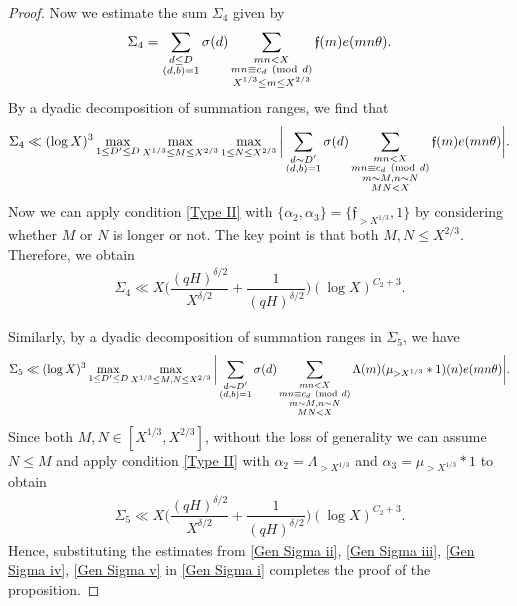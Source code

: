 \documentclass[12pt]{amsart}
\numberwithin{equation}{section}
\theoremstyle{remark}
\theoremstyle{definition}
\newcommand{\imod}[1]{\ (\mathrm{mod}\ #1)}
\begin{document}
\begin{proof}
Now we estimate the sum $\Sigma_4$ given by
\begin{align}\notag 
\Sigma_4 = \sum_{\substack{d\leq D\\(d, b)=1}}\sigma(d)\sum_{\substack{mn<X\\mn\equiv c_d\imod d\\ X^{1/3} \leq m\leq X^{2/3}}}\mathfrak{f}(m)e(mn\theta).
\end{align}
By a dyadic decomposition of summation ranges, we find that
\begin{align}\notag 
\Sigma_4\ll (\log X)^3 \max_{1\leq D'\leq D}\max_{X^{1/3}\leq M\leq X^{2/3}}\max_{1\leq N\leq X^{2/3}}\bigg|\sum_{\substack{d\sim D'\\(d, b)=1}}\sigma(d)\sum_{\substack{mn<X\\mn\equiv c_d\imod d\\ m\sim M, n\sim N\\MN<X}}\mathfrak{f}(m)e(mn\theta)\bigg|.
\end{align}
Now we can apply condition \ref{Type II} with $\{\alpha_2, \alpha_3\}=\{\mathfrak{f}_{>X^{1/3}}, 1\}$ by considering whether $M$ or $N$ is longer or not. The key point is that both $M, N\leq X^{2/3}$. Therefore, we obtain
\begin{align}
\label{Gen Sigma iv}\Sigma_4 \ll X\bigg(\dfrac{(qH)^{\delta/2}}{X^{\delta/2}} + \dfrac{1}{(qH)^{\delta/2}}\bigg)(\log X)^{C_2+3}.
\end{align}

Similarly, by a dyadic decomposition of summation ranges in $\Sigma_5$, we have
\begin{align}\notag
\Sigma_5 \ll (\log X)^3 \max_{1\leq D'\leq D}\max_{X^{1/3}\leq M, N\leq X^{2/3}}\bigg|\sum_{\substack{d\sim D'\\(d, b)=1}}\sigma(d)\sum_{\substack{mn<X\\mn\equiv c_d\imod d\\ m\sim M, n\sim N\\MN<X}}\Lambda(m) (\mu_{> X^{1/3}}*1)(n)e(mn\theta)\bigg|.
\end{align}
Since both $M, N\in [X^{1/3}, X^{2/3}]$, without the loss of generality we can assume $N\leq M$ and apply condition \ref{Type II} with $\alpha_2=\Lambda_{>X^{1/3}}$ and $\alpha_3= \mu_{>X^{1/3}}*1$ to obtain
\begin{align}
\label{Gen Sigma v}\Sigma_5 \ll X\bigg(\dfrac{(qH)^{\delta/2}}{X^{\delta/2}} + \dfrac{1}{(qH)^{\delta/2}}\bigg)(\log X)^{C_2+3}.
\end{align}
Hence, substituting the estimates from \eqref{Gen Sigma ii}, \eqref{Gen Sigma iii}, \eqref{Gen Sigma iv}, \eqref{Gen Sigma v} in \eqref{Gen Sigma i} completes the proof of the proposition.
\end{proof}
\end{document}
